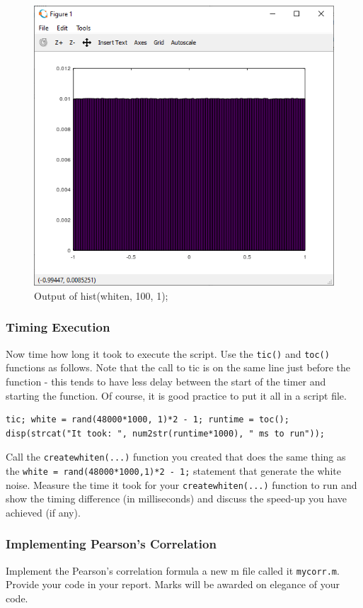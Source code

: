 \begin{figure}[H]
\centering
\includegraphics[width=0.6\columnwidth]{Figures/octave_hist}
\caption{Output of hist(whiten, 100, 1);}
\label{fig:octave_hist}
\end{figure}

\subsubsection{Timing Execution}
Now time how long it took to execute the script. Use the \verb|tic()| and \verb|toc()| functions as follows. Note that the call to tic is on the same line just before the function - this tends to have less delay between the start of the timer and starting the function. Of course, it is good practice to put it all in a script file.
\begin{lstlisting}
tic; white = rand(48000*1000, 1)*2 - 1; runtime = toc();
disp(strcat("It took: ", num2str(runtime*1000), " ms to run"));
\end{lstlisting}

Call the \verb|createwhiten(...)| function you created that does the same thing as the \verb|white = rand(48000*1000,1)*2 - 1;| statement that generate the white noise. Measure the time it took for your \verb|createwhiten(...)| function to run and show the timing difference (in milliseconds) and discuss the speed-up you have achieved (if any).

\subsubsection{Implementing Pearson's Correlation}
Implement the Pearson's correlation formula a new m file called it \verb|mycorr.m|. Provide your code in your report. Marks will be awarded on elegance of your code.

